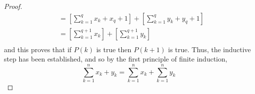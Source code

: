 \begin{example}
\begin{proof}
\begin{align*}
                    & =  \left [ \sum_{k=1}^{q}{x_k} + x_q+1 \right ]  + \left [ \sum_{k=1}^{q}{y_k} + y_q+1 \right ] \\
                    & =  \left [ \sum_{k=1}^{q+1}{x_k} \right ]  + \left [ \sum_{k=1}^{q+1}{y_k} \right ] \\
            \end{align*}
        and this proves that if $P(k)$ is true then $P(k+1)$ is true. Thus, the inductive step has been established, and so by the first principle of finite induction,
            \begin{equation*}
                 \sum_{k=1}^{n}{x_k + y_k} = \sum_{k=1}^{n}{x_k} + \sum_{k=1}^{n}{y_k} 
            \end{equation*}
    \end{proof}
\end{example}










































\newpage
